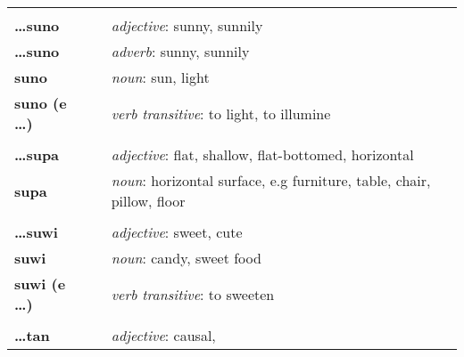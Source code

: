 \begin{supertabular}{p{2,5cm}|ll}
                                 &  &                                                                                                            \\
    \textbf{\dots suno}          &  & \textit{adjective}: sunny, sunnily                                                                         \\
    \textbf{\dots suno}          &  & \textit{adverb}: sunny, sunnily                                                                            \\
    \textbf{suno}                &  & \textit{noun}: sun, light                                                                                  \\
    \textbf{suno (e \dots)}      &  & \textit{verb transitive}: to light, to illumine                                                            \\
                                 &  &                                                                                                            \\
    \textbf{\dots supa}          &  & \textit{adjective}: flat, shallow, flat-bottomed, horizontal                                               \\
    \textbf{supa}                &  & \textit{noun}: horizontal surface, e.g furniture, table, chair, pillow, floor                              \\
                                 &  &                                                                                                            \\
    \textbf{\dots suwi}          &  & \textit{adjective}: sweet, cute                                                                            \\
    \textbf{suwi}                &  & \textit{noun}: candy, sweet food                                                                           \\
    \textbf{suwi (e \dots)}      &  & \textit{verb transitive}: to sweeten                                                                       \\
                                 &  &                                                                                                            \\
    \textbf{\dots tan}           &  & \textit{adjective}: causal,                                                                                \\

\end{supertabular}
